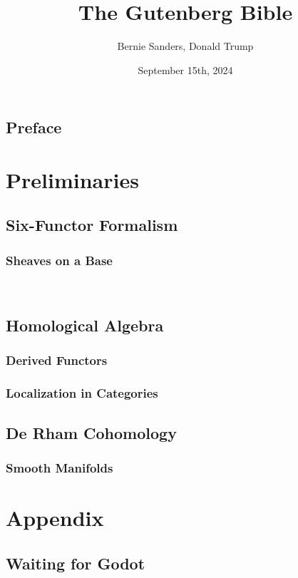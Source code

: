 \documentclass[12pt]{void}
\theoremstyle{plain}
\theoremstyle{definition}
\theoremstyle{remark}
\begin{document}
\pagestyle{empty}
\title{The Gutenberg Bible}
\author{Bernie Sanders, Donald Trump}
\date{September 15th, 2024}
\maketitle
\tableofcontents
\cleardoublepage %

\mainmatter
{}
\pagestyle{plain} %

\chapter*{Preface}

\lipsum[39-50]

\part{Preliminaries}

\chapter{Six-Functor Formalism}

\lipsum[3-19]

\section{Sheaves on a Base}

\lipsum[2-4]~\cite{EGA}

\chapter{Homological Algebra}

\section{Derived Functors}

\lipsum[19-23]

\section{Localization in Categories}

\lipsum[1-3]

\chapter{De Rham Cohomology}

\lipsum[9-12]

\section{Smooth Manifolds}

\lipsum[21-23]

\part{Appendix}

\chapter{Waiting for Godot}

\lipsum[18]



\end{document}
